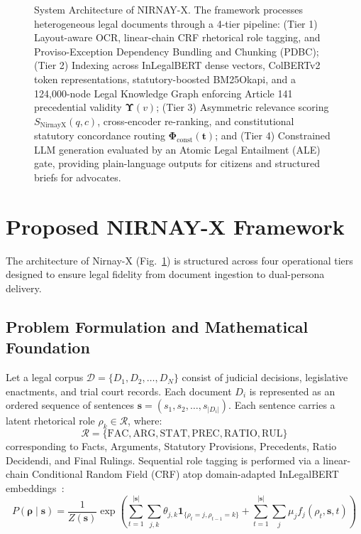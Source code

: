 \documentclass[conference]{IEEEtran}
\begin{document}
\begin{figure}[!t]
\caption{System Architecture of NIRNAY-X. The framework processes heterogeneous legal documents through a 4-tier pipeline: (Tier 1) Layout-aware OCR, linear-chain CRF rhetorical role tagging, and Proviso-Exception Dependency Bundling and Chunking (PDBC); (Tier 2) Indexing across InLegalBERT dense vectors, ColBERTv2 token representations, statutory-boosted BM25Okapi, and a 124,000-node Legal Knowledge Graph enforcing Article 141 precedential validity $\mathbf{\Upsilon}(v)$; (Tier 3) Asymmetric relevance scoring $S_{\text{NirnayX}}(q, c)$, cross-encoder re-ranking, and constitutional statutory concordance routing $\mathbf{\Phi}_{\text{const}}(\mathbf{t})$; and (Tier 4) Constrained LLM generation evaluated by an Atomic Legal Entailment (ALE) gate, providing plain-language outputs for citizens and structured briefs for advocates.}
\label{fig:architecture}
\end{figure}

\section{Proposed NIRNAY-X Framework}
The architecture of Nirnay-X (Fig.~\ref{fig:architecture}) is structured across four operational tiers designed to ensure legal fidelity from document ingestion to dual-persona delivery.

\subsection{Problem Formulation and Mathematical Foundation}
Let a legal corpus $\mathcal{D} = \{D_1, D_2, \dots, D_N\}$ consist of judicial decisions, legislative enactments, and trial court records. Each document $D_i$ is represented as an ordered sequence of sentences $\mathbf{s} = (s_1, s_2, \dots, s_{|D_i|})$. Each sentence carries a latent rhetorical role $\rho_k \in \mathcal{R}$, where:
\begin{equation}
\mathcal{R} = \{\text{FAC}, \text{ARG}, \text{STAT}, \text{PREC}, \text{RATIO}, \text{RUL}\}
\end{equation}
corresponding to Facts, Arguments, Statutory Provisions, Precedents, Ratio Decidendi, and Final Rulings. Sequential role tagging is performed via a linear-chain Conditional Random Field (CRF) atop domain-adapted InLegalBERT embeddings~\cite{lafferty2001crf}:
\begin{equation}
P(\mathbf{\rho} \mid \mathbf{s}) = \frac{1}{Z(\mathbf{s})} \exp\left( \sum_{t=1}^{|\mathbf{s}|} \sum_{j, k} \theta_{j, k} \mathbf{1}_{\{\rho_t = j, \rho_{t-1} = k\}} + \sum_{t=1}^{|\mathbf{s}|} \sum_j \mu_j f_j(\rho_t, \mathbf{s}, t) \right)
\end{equation}
\end{document}
